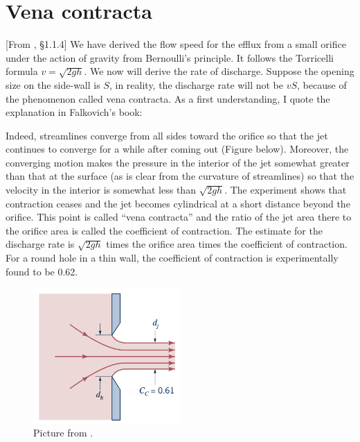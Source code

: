 \documentclass[11pt,letterpaper]{report}
\begin{document}
\section{Vena contracta}
[From \cite{Falkovich_18}, \S 1.1.4] We have derived the flow speed for the efflux from a small orifice under the action of gravity from Bernoulli's principle. It follows the Torricelli formula $v = \sqrt{2gh}$. We now will derive the rate of discharge. Suppose the opening size on the side-wall is $S$, in reality, the discharge rate will not be $vS$, because of the phenomenon called vena contracta. As a first understanding, I quote the explanation in Falkovich's book:
\begin{displayquote}
    Indeed, streamlines converge from all sides toward the orifice so that the jet continues to converge for a while after coming out (Figure below). Moreover, the converging motion makes the pressure in the interior of the jet somewhat greater than that at the surface (as is clear from the curvature of streamlines) so that the velocity in the interior is somewhat less than $\sqrt{2gh}$. The experiment shows that contraction ceases and the jet becomes cylindrical at a short distance beyond the orifice. This point is called ``vena contracta'' and the ratio of the jet area there to the orifice area is called the coefficient of contraction. The estimate for the discharge rate is $\sqrt{2gh}$ times the orifice area times the coefficient of contraction. For a round hole in a thin wall, the coefficient of contraction is experimentally found to be 0.62.
\end{displayquote}
\begin{figure}[H]
    \centering
    \includegraphics[width=0.5\textwidth]{Session_5/figs/vena_contracta}
    \caption{Picture from \cite{GerhartEtAl_20}.}
\end{figure}
\end{document}
